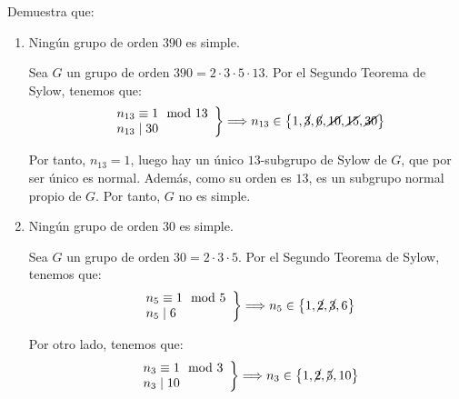 \documentclass[12pt]{article}
\begin{document}
    \begin{ejercicio}
        Demuestra que:
        \begin{enumerate}
            \item Ningún grupo de orden $390$ es simple.
            
            Sea $G$ un grupo de orden $390=2\cdot 3\cdot 5\cdot 13$. Por el Segundo Teorema de Sylow, tenemos que:
            \begin{align*}
                \left.\begin{array}{l}
                    n_{13} \equiv 1 \mod 13 \\
                    n_{13} \mid 30
                \end{array}
                \right\}
                \Longrightarrow n_{13} \in \left\{1,\cancel{3},\cancel{6},\cancel{10},\cancel{15},\cancel{30}\right\}
            \end{align*}

            Por tanto, $n_{13}=1$, luego hay un único $13$-subgrupo de Sylow de $G$, que por ser único es normal. Además, como su orden es $13$, es un subgrupo normal propio de $G$. Por tanto, $G$ no es simple.
            \item Ningún grupo de orden $30$ es simple.
            

            Sea $G$ un grupo de orden $30=2\cdot 3\cdot 5$. Por el Segundo Teorema de Sylow, tenemos que:
            \begin{align*}
                \left.\begin{array}{l}
                    n_{5} \equiv 1 \mod 5 \\
                    n_{5} \mid 6
                \end{array}
                \right\}
                \Longrightarrow n_{5} \in \left\{1,\cancel{2},\cancel{3},6\right\}
            \end{align*}
            
            Por otro lado, tenemos que:
            \begin{align*}
                \left.\begin{array}{l}
                    n_{3} \equiv 1 \mod 3 \\
                    n_{3} \mid 10
                \end{array}
                \right\}
                \Longrightarrow n_{3} \in \left\{1,\cancel{2},\cancel{5},10\right\}
            \end{align*}


\end{enumerate}
\end{ejercicio}
\end{document}
